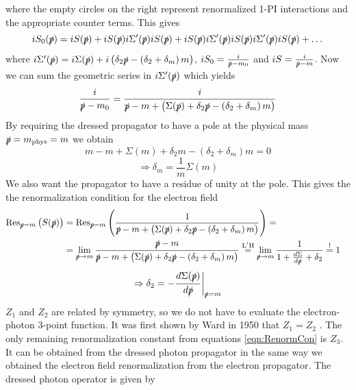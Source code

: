 where the empty circles on the right represent renormalized 1-PI interactions and the appropriate counter terms. This gives
\begin{equation}
iS_0(\slashed{p}) = iS(\slashed{p}) + iS(\slashed{p}) i\Sigma'(\slashed{p}) iS(\slashed{p}) + iS(\slashed{p}) i\Sigma'(\slashed{p}) iS(\slashed{p}) i\Sigma'(\slashed{p}) iS(\slashed{p}) + \dots
\end{equation}
where $i\Sigma'(\slashed{p}) = i\Sigma(\slashed{p}) + i \left( \delta_2 \slashed{p} - \left( \delta_2 + \delta_m \right) m \right)$, $iS_0 = \frac{i}{\slashed{p} - m_0}$ and $iS = \frac{i}{\slashed{p} - m}$. Now we can sum the geometric series in $i\Sigma'(\slashed{p})$ which yields
\begin{equation}
\frac{i}{\slashed{p}-m_0} = \frac{i}{\slashed{p} - m + \left( \Sigma(\slashed{p}) + \delta_2 \slashed{p} - \left( \delta_2 + \delta_m \right) m \right)}
\end{equation}
By requiring the dressed propagator to have a pole at the physical mass $\slashed{p} = m_{\mathrm{phys}} = m$ we obtain 
\begin{equation}
m - m + \Sigma(m) + \delta_2 m - \left( \delta_2 + \delta_m \right) m = 0
\end{equation}
\begin{equation}
\Rightarrow \delta_m = \frac{1}{m} \Sigma(m)
\end{equation}
We also want the propagator to have a residue of unity at the pole. This gives the the renormalization condition for the electron field
\begin{align*}
\mathrm{Res}_{\slashed{p} = m} \left( S(\slashed{p}) \right) & = \mathrm{Res}_{\slashed{p} = m} \left( \frac{1}{\slashed{p} - m + \left( \Sigma(\slashed{p}) + \delta_2 \slashed{p} - \left( \delta_2 + \delta_m \right) m \right)} \right) = & \\
& = \lim_{\slashed{p} \rightarrow m} \frac{\slashed{p} - m}{\slashed{p} - m + \left( \Sigma(\slashed{p}) + \delta_2 \slashed{p} - \left( \delta_2 + \delta_m \right) m \right)} \overset{\mathrm{L'H}}{=} \lim_{\slashed{p} \rightarrow m} \frac{1}{1 + \frac{d\Sigma}{d\slashed{p}} + \delta_2} \overset{\mathrm{!}}{=} 1 &
\end{align*}
\begin{equation}
\Rightarrow \delta_2 = - \frac{d\Sigma(\slashed{p})}{d\slashed{p}} \biggr\rvert_{\slashed{p} = m}
\end{equation}
$Z_1$ and $Z_2$ are related by symmetry, so we do not have to evaluate the electron-photon 3-point function. It was first shown by Ward in 1950 that $Z_1 = Z_2$ \cite{WardId}.
The only remaining renormalization constant from equations \ref{eqn:RenormCon} is $Z_3$. It can be obtained from the dressed photon propagator in the same way we obtained the electron field renormalization from the electron propagator. The dressed photon operator is given by
